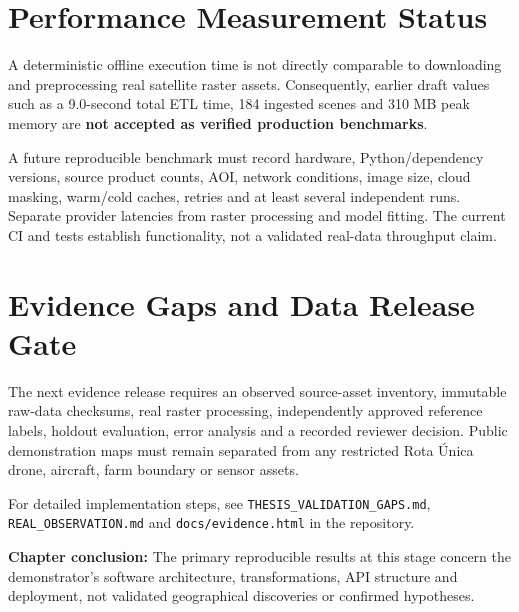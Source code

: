 \section{Performance Measurement Status}

A deterministic offline execution time is not directly comparable to downloading and preprocessing real satellite raster assets. Consequently, earlier draft values such as a 9.0-second total ETL time, 184 ingested scenes and 310 MB peak memory are \textbf{not accepted as verified production benchmarks}.

A future reproducible benchmark must record hardware, Python/dependency versions, source product counts, AOI, network conditions, image size, cloud masking, warm/cold caches, retries and at least several independent runs. Separate provider latencies from raster processing and model fitting. The current CI and tests establish functionality, not a validated real-data throughput claim.

\section{Evidence Gaps and Data Release Gate}

The next evidence release requires an observed source-asset inventory, immutable raw-data checksums, real raster processing, independently approved reference labels, holdout evaluation, error analysis and a recorded reviewer decision. Public demonstration maps must remain separated from any restricted Rota Única drone, aircraft, farm boundary or sensor assets.

For detailed implementation steps, see \texttt{THESIS\_VALIDATION\_GAPS.md}, \texttt{REAL\_OBSERVATION.md} and \texttt{docs/evidence.html} in the repository.

\textbf{Chapter conclusion:} The primary reproducible results at this stage concern the demonstrator's software architecture, transformations, API structure and deployment, not validated geographical discoveries or confirmed hypotheses.

